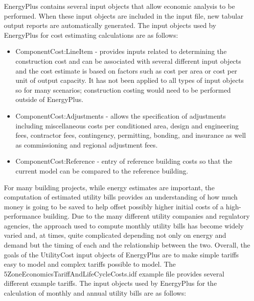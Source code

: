 EnergyPlus contains several input objects that allow economic analysis
to be performed. When these input objects are included in the input
file, new tabular output reports are automatically generated. The
input objects used by EnergyPlus for cost estimating calculations
are as follows:
\begin{itemize}
\item ComponentCost:LineItem - provides inputs related to determining the
construction cost and can be associated with several different input
objects and the cost estimate is based on factors such as cost per
area or cost per unit of output capacity. It has not been applied
to all types of input objects so for many scenarios; construction
costing would need to be performed outside of EnergyPlus.
\item ComponentCost:Adjustments - allows the specification of adjustments
including miscellaneous costs per conditioned area, design and engineering
fees, contractor fees, contingency, permitting, bonding, and insurance
as well as commissioning and regional adjustment fees.
\item ComponentCost:Reference - entry of reference building costs so that
the current model can be compared to the reference building.
\end{itemize}
For many building projects, while energy estimates are important,
the computation of estimated utility bills provides an understanding
of how much money is going to be saved to help offset possibly higher
initial costs of a high-performance building. Due to the many different
utility companies and regulatory agencies, the approach used to compute
monthly utility bills has become widely varied and, at times, quite
complicated depending not only on energy and demand but the timing
of each and the relationship between the two. Overall, the goals of
the UtilityCost input objects of EnergyPlus are to make simple tariffs
easy to model and complex tariffs possible to model. The 5ZoneEconomicsTariffAndLifeCycleCosts.idf
example file provides several different example tariffs. The input
objects used by EnergyPlus for the calculation of monthly and annual
utility bills are as follows:
